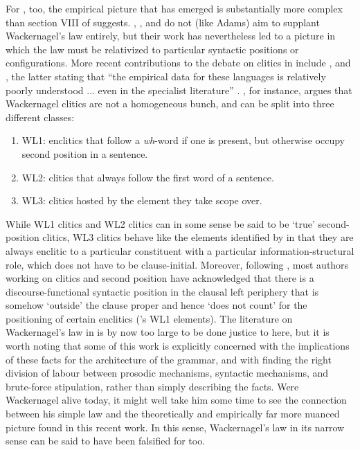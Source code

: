 For , too, the empirical picture that has emerged is substantially more complex than section VIII of \citet{Wackernagel1892} suggests. \citet{Hale1987PhD,Hale1987wackernagel,Hale1996}, \citet{Krisch1990}, and \citet{Hock1996} do not (like Adams) aim to supplant Wackernagel's law entirely, but their work has nevertheless led to a picture in which the law must be relativized to particular syntactic positions or configurations. More recent contributions to the debate on clitics in  include \citet{Keydana2011}, \citet{Lowe2014} and \citet{Hale2017}, the latter stating that ``the empirical data for these languages is relatively poorly understood ... even in the specialist literature'' \citeyearpar[290]{Hale2017}. \citet{Keydana2011}, for instance, argues that Wackernagel clitics are not a homogeneous bunch, and can be split into three different classes:

\begin{enumerate}
    \item WL1: enclitics that follow a \textit{wh}-word if one is present, but otherwise occupy second position in a sentence.
    \item WL2: clitics that always follow the first word of a sentence.
    \item WL3: clitics hosted by the element they take scope over.
\end{enumerate}

While WL1 clitics and WL2 clitics can in some sense be said to be `true' second-position clitics, WL3 clitics behave like the elements identified by \citet{Adams1994book,Adams1994pronouns} in that they are always enclitic to a particular constituent with a particular information-structural role, which does not have to be clause-initial. Moreover, following \citet{Hale1987wackernagel,Hale1987PhD}, most authors working on  clitics and second position have acknowledged that there is a discourse-functional syntactic position in the clausal left periphery that is somehow `outside' the clause proper and hence `does not count' for the positioning of certain enclitics (\citeauthor{Keydana2011}'s WL1 elements). The literature on Wackernagel's law in  is by now too large to be done justice to here, but it is worth noting that some of this work is explicitly concerned with the implications of these facts for the architecture of the grammar, and with finding the right division of labour between prosodic mechanisms, syntactic mechanisms, and brute-force stipulation, rather than simply describing the facts. Were Wackernagel alive today, it might well take him some time to see the connection between his simple law and the theoretically and empirically far more nuanced picture found in this recent work. In this sense, Wackernagel's law in its narrow sense can be said to have been falsified for  too.

